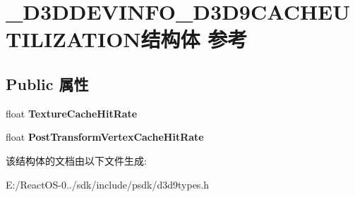 \hypertarget{struct___d3_d_d_e_v_i_n_f_o___d3_d9_c_a_c_h_e_u_t_i_l_i_z_a_t_i_o_n}{}\section{\+\_\+\+D3\+D\+D\+E\+V\+I\+N\+F\+O\+\_\+\+D3\+D9\+C\+A\+C\+H\+E\+U\+T\+I\+L\+I\+Z\+A\+T\+I\+O\+N结构体 参考}
\label{struct___d3_d_d_e_v_i_n_f_o___d3_d9_c_a_c_h_e_u_t_i_l_i_z_a_t_i_o_n}
\subsection*{Public 属性}
\begin{DoxyCompactItemize}
\item 
\mbox{\label{struct___d3_d_d_e_v_i_n_f_o___d3_d9_c_a_c_h_e_u_t_i_l_i_z_a_t_i_o_n_aa2c91227ad6700392068f98a7db6c0b0}} 
float {\bfseries Texture\+Cache\+Hit\+Rate}
\item 
\mbox{\label{struct___d3_d_d_e_v_i_n_f_o___d3_d9_c_a_c_h_e_u_t_i_l_i_z_a_t_i_o_n_a98c6cd220e13ddfe2bae53a59541af36}} 
float {\bfseries Post\+Transform\+Vertex\+Cache\+Hit\+Rate}
\end{DoxyCompactItemize}


该结构体的文档由以下文件生成\+:\begin{DoxyCompactItemize}
\item 
E\+:/\+React\+O\+S-\/0../sdk/include/psdk/d3d9types.\+h\end{DoxyCompactItemize}
